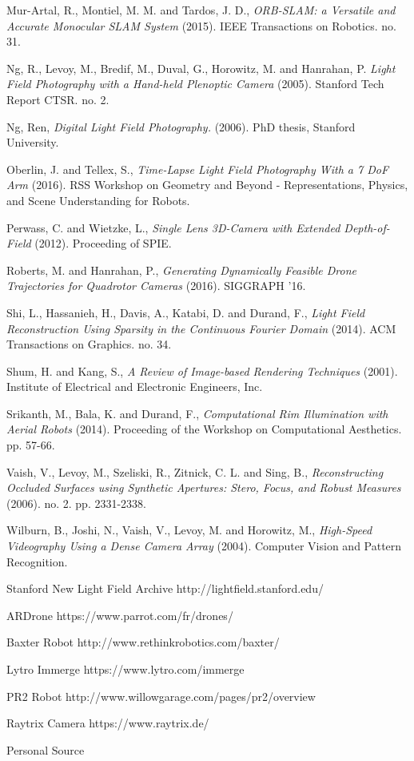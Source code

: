 \documentclass[12pt]{report}
\begin{document}
\begin{thebibliography}{10}
	Mur-Artal, R., Montiel, M. M. and Tardos, J. D., \emph{ORB-SLAM: a Versatile and Accurate Monocular SLAM System} (2015). IEEE Transactions on Robotics. no. 31.

	Ng, R., Levoy, M., Bredif, M., Duval, G., Horowitz, M. and Hanrahan, P. \emph{Light Field Photography with a Hand-held Plenoptic Camera} (2005). Stanford Tech Report CTSR. no. 2.

	Ng, Ren, \emph{Digital Light Field Photography.} (2006). PhD thesis, Stanford University.	

	Oberlin, J. and Tellex, S., \emph{Time-Lapse Light Field Photography With a 7 DoF Arm} (2016). RSS Workshop on Geometry and Beyond - Representations, Physics, and Scene Understanding for Robots. 

	Perwass, C. and Wietzke, L., \emph{Single Lens 3D-Camera with Extended Depth-of-Field} (2012). Proceeding of SPIE.

	Roberts, M. and Hanrahan, P., \emph{Generating Dynamically Feasible Drone Trajectories for Quadrotor Cameras} (2016). SIGGRAPH '16.

	Shi, L., Hassanieh, H., Davis, A., Katabi, D. and Durand, F., \emph{Light Field Reconstruction Using Sparsity in the Continuous Fourier Domain} (2014). ACM Transactions on Graphics. no. 34.

	Shum, H. and Kang, S., \emph{A Review of Image-based Rendering Techniques} (2001). Institute of Electrical and Electronic Engineers, Inc.

	Srikanth, M., Bala, K. and Durand, F., \emph{Computational Rim Illumination with Aerial Robots} (2014). Proceeding of the Workshop on Computational Aesthetics. pp. 57-66.

	Vaish, V., Levoy, M., Szeliski, R., Zitnick, C. L. and Sing, B., \emph{Reconstructing Occluded Surfaces using Synthetic Apertures: Stero, Focus, and Robust Measures} (2006). no. 2. pp. 2331-2338.
	
	Wilburn, B., Joshi, N., Vaish, V., Levoy, M. and Horowitz, M., \emph{High-Speed Videography Using a Dense Camera Array} (2004). Computer Vision and Pattern Recognition.

	Stanford New Light Field Archive http://lightfield.stanford.edu/

	ARDrone https://www.parrot.com/fr/drones/

	Baxter Robot http://www.rethinkrobotics.com/baxter/
	
	Lytro Immerge https://www.lytro.com/immerge
	
	PR2 Robot http://www.willowgarage.com/pages/pr2/overview
	
	Raytrix Camera https://www.raytrix.de/
	
	Personal Source

\end{thebibliography}
\end{document}
